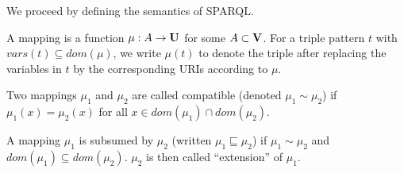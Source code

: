 We proceed by defining the semantics of SPARQL. 

\begin{definition}\label{def:sparqlsem}
	A mapping is a function $\mu: A \rightarrow  \mathbf{U}$ for some $A \subset \mathbf{V}$. 
	For a triple pattern $t$ with $vars(t) \subseteq dom(\mu)$, we write $\mu(t)$ to 
	denote the triple after replacing the variables in $t$ by the corresponding 
	URIs according to $\mu$. 

	\noindent Two mappings $\mu_1$ and $\mu_2$ are called compatible (denoted $\mu_1 \sim \mu_2$) 
	if $\mu_1(x) = \mu_2(x)$ for all $x \in dom(\mu_1) \cap dom(\mu_2)$.

	\noindent A mapping $\mu_1$ is subsumed by $\mu_2$ (written $\mu_1 \sqsubseteq \mu_2$) 
	if $\mu_1 \sim \mu_2$ and $dom(\mu_1) \subseteq dom(\mu_2)$. $\mu_2$ is then called ``extension'' of $\mu_1$.


\end{definition}

